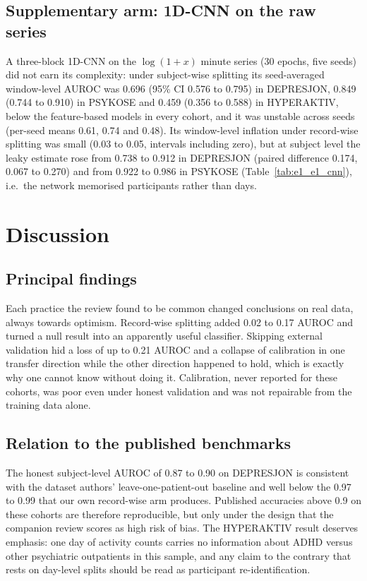 \documentclass[11pt,a4paper]{article}
\begin{document}
\subsection{Supplementary arm: 1D-CNN on the raw series}

A three-block 1D-CNN on the $\log(1+x)$ minute series (30 epochs, five seeds) did not earn its
complexity: under subject-wise splitting its seed-averaged window-level AUROC was 0.696 (95\% CI
0.576 to 0.795) in DEPRESJON, 0.849 (0.744 to 0.910) in PSYKOSE and 0.459 (0.356 to 0.588) in
HYPERAKTIV, below the feature-based models in every cohort, and it was unstable across seeds
(per-seed means 0.61, 0.74 and 0.48). Its window-level inflation under record-wise splitting was
small (0.03 to 0.05, intervals including zero), but at subject level the leaky estimate rose from
0.738 to 0.912 in DEPRESJON (paired difference 0.174, 0.067 to 0.270) and from 0.922 to 0.986 in
PSYKOSE (Table~\ref{tab:e1_e1_cnn}), i.e.\ the network memorised participants rather than days.

\section{Discussion}
\subsection{Principal findings}
Each practice the review found to be common changed conclusions on real data, always towards
optimism. Record-wise splitting added 0.02 to 0.17 AUROC and turned a null result into an apparently
useful classifier. Skipping external validation hid a loss of up to 0.21 AUROC and a collapse of
calibration in one transfer direction while the other direction happened to hold, which is exactly
why one cannot know without doing it. Calibration, never reported for these cohorts, was poor even
under honest validation and was not repairable from the training data alone.

\subsection{Relation to the published benchmarks}
The honest subject-level AUROC of 0.87 to 0.90 on DEPRESJON is consistent with the dataset
authors' leave-one-patient-out baseline \cite{garciaceja2018} and well below the 0.97 to 0.99
that our own record-wise arm produces. Published accuracies above 0.9 on these cohorts
\cite{jmir2025,arxiv2303,psykose_dl2024} are therefore reproducible, but only under the design
that the companion review scores as high risk of bias. The HYPERAKTIV result deserves emphasis:
one day of activity counts carries no information about ADHD versus other psychiatric outpatients
in this sample, and any claim to the contrary that rests on day-level splits should be read as
participant re-identification.
\end{document}
